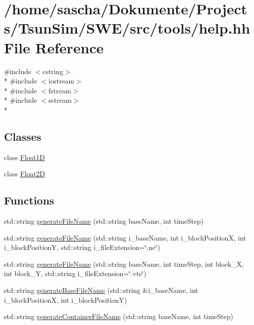 \hypertarget{help_8hh}{\section{/home/sascha/\-Dokumente/\-Projects/\-Tsun\-Sim/\-S\-W\-E/src/tools/help.hh File Reference}
\label{help_8hh}
}
{\ttfamily \#include $<$cstring$>$}\\*
{\ttfamily \#include $<$iostream$>$}\\*
{\ttfamily \#include $<$fstream$>$}\\*
{\ttfamily \#include $<$sstream$>$}\\*
\subsection*{Classes}
\begin{DoxyCompactItemize}
\item 
class \hyperlink{classFloat1D}{Float1\-D}
\item 
class \hyperlink{classFloat2D}{Float2\-D}
\end{DoxyCompactItemize}
\subsection*{Functions}
\begin{DoxyCompactItemize}
\item 
std\-::string \hyperlink{help_8hh_aa10dc278c6ac60f9cd49955cbe16fbcb}{generate\-File\-Name} (std\-::string base\-Name, int time\-Step)
\item 
std\-::string \hyperlink{help_8hh_a206f33ce37fa47f8635d02a1cfc9881f}{generate\-File\-Name} (std\-::string i\-\_\-base\-Name, int i\-\_\-block\-Position\-X, int i\-\_\-block\-Position\-Y, std\-::string i\-\_\-file\-Extension=\char`\"{}.nc\char`\"{})
\item 
std\-::string \hyperlink{help_8hh_ab05bce4e4d30d0b9fb85f81668f98f79}{generate\-File\-Name} (std\-::string base\-Name, int time\-Step, int block\-\_\-\-X, int block\-\_\-\-Y, std\-::string i\-\_\-file\-Extension=\char`\"{}.vts\char`\"{})
\item 
std\-::string \hyperlink{help_8hh_a7dc37444a6b7771aefff04a38e74e086}{generate\-Base\-File\-Name} (std\-::string \&i\-\_\-base\-Name, int i\-\_\-block\-Position\-X, int i\-\_\-block\-Position\-Y)
\item 
std\-::string \hyperlink{help_8hh_a427928180ec14bf889c55e5cc51d8e36}{generate\-Container\-File\-Name} (std\-::string base\-Name, int time\-Step)
\end{DoxyCompactItemize}


